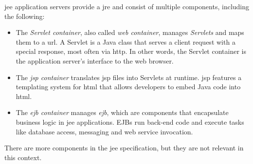 \begin{description}
	\gls{jee} application servers provide a \gls{jre} and consist of multiple components, including the following:
	\begin{itemize}
		\item The \emph{Servlet container}, also called \emph{web container}, manages \emph{Servlets} and maps them to a \gls{url}. A Servlet is a Java class that serves a client request with a special response, most often via \gls{http}. In other words, the Servlet container is the application server's interface to the web browser.
		\item The \emph{\gls{jsp} container} translates \gls{jsp} files into Servlets at runtime. \gls{jsp} features a templating system for \gls{html} that allows developers to embed Java code into \gls{html}.
		\item The \emph{\acs{ejb} container} manages \emph{\gls{ejb}}, which are components that encapsulate business logic in \gls{jee} applications. EJBs run back-end code and execute tasks like database access, messaging and web service invocation.
	\end{itemize}
	There are more components in the \gls{jee} specification, but they are not relevant in this context.
\end{description}
